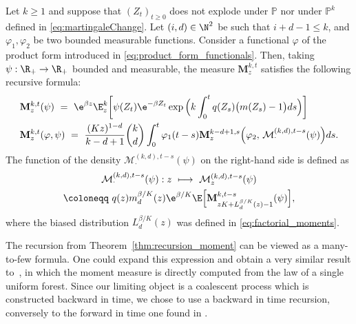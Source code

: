 \begin{refsegment}
\begin{thm}\label{thm:recursion_moment}
    Let $k \geqslant 1$ and suppose that $(Z_t)_{t \geqslant 0}$ does not explode
    under $\mathbb{P}$ nor under $\mathbb{P}^k$ defined in
    \eqref{eq:martingaleChange}. Let $(i,d)\in\N^2$ be such that
    $i+d-1\leqslant k$, and $\varphi_1,\varphi_2$ be two bounded measurable
    functions. Consider a functional $\varphi$ of the product form
    introduced in \eqref{eq:product_form_functionals}. Then, taking
    $\psi:\R_+\to \R_+$ bounded and measurable, the measure
    $\mathbf{M}^{k,t}_{z}$ satisfies the following recursive formula:
    \begin{align}\label{eq:base_case}
       &\mathbf{M}^{k,t}_{z}(\psi)\ =\ \e^{\beta z}\E^k_{z}\bigg[ \psi(Z_t)\e^{-\beta Z_t}\exp\Big(k\int_0^t q(Z_s) \big(m(Z_s)-1\big)ds\Big)\bigg] \\ \label{eq:induction}
       & \mathbf{M}^{k,t}_{z}(\varphi,\psi)\  =\  \frac{(Kz)^{1-d}
       }{k-d+1}\binom{k}{d}\int_0^t \varphi_1(t-s)\mathbf{M}^{k-d+1,s}_{z}\Big(\varphi_2,\,
   \mathcal{M}^{(k,d),t-s}_{\cdot}(\psi)\Big)ds.
      \end{align}
    The function of the density $\mathcal{M}^{(k,d),t-s}_{\cdot}(\psi)$
    on the right-hand side is defined as
\begin{multline}\label{eq:psi_tilde_recursive_formula}
\mathcal{M}^{(k,d),t-s}_{\cdot}(\psi):  z\ \longmapsto\ \mathcal{M}^{(k,d),t-s}_{z}(\psi)\\ \coloneqq\ q(z) m^{\beta/K}_d(z)\e^{\beta/K}\E\Big[\mathbf{M}^{k,t-s}_{zK+ L^{\beta/K}_d(z)-1}(\psi)\Big],
\end{multline}
where the biased distribution $ L^{\beta/K}_d(z)$ was defined in
\eqref{eq:factorial_moments}.
\end{thm}

\begin{rem}
The recursion from Theorem~\ref{thm:recursion_moment} can be viewed as a many-to-few formula. 
One could expand this expression and obtain a very similar result to~\citet*{schertzer2023spectral, FST_Semipushed_2024}, in which the moment measure is directly computed from the law of a single uniform forest. 
Since our limiting object is a coalescent process which is constructed backward in time, we chose to use a backward in time recursion, conversely to the forward in time one found in \cite{schertzer2023spectral, FST_Semipushed_2024}.
\end{rem}


\end{refsegment}

